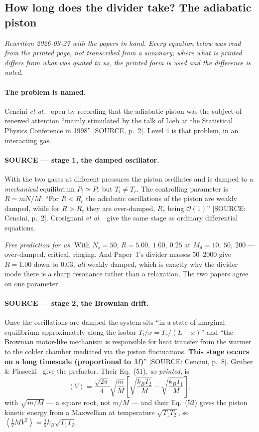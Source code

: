 \documentclass[11pt,a4paper]{article}
\newcommand{\avg}[1]{\left\langle #1 \right\rangle}
\begin{document}
\subsection{How long does the divider take? The adiabatic piston}\label{sec:l4tau}

\emph{Rewritten 2026-09-27 with the papers in hand. Every equation below was read from the printed
page, not transcribed from a summary; where what is printed differs from what was quoted to us, the
printed form is used and the difference is noted.}

\paragraph{The problem is named.} Cencini \emph{et al.}~\cite{cencini2007} open by recording that
the adiabatic piston was the subject of renewed attention ``mainly stimulated by the talk of Lieb at
the Statistical Physics Conference in 1998'' [SOURCE, p.~2]. Level 4 is that problem, in an
interacting gas.

\paragraph{SOURCE --- stage 1, the damped oscillator.} With the two gases at different pressures the
piston oscillates and is damped to a \emph{mechanical} equilibrium $P_l \simeq P_r$ but
$T_l \neq T_r$. The controlling parameter is $R = mN/M$: ``For $R < R_c$ the adiabatic oscillations
of the piston are weakly damped, while for $R > R_c$ they are over-damped, $R_c$ being
$\mathcal{O}(1)$'' [SOURCE: Cencini, p.~2]. Crosignani \emph{et al.}~\cite{crosignani1996} give the
same stage as ordinary differential equations.

\emph{Free prediction for us.} With $N_s = 50$, $R = 5.00,\ 1.00,\ 0.25$ at
$M_d = 10,\ 50,\ 200$ --- over-damped, critical, ringing. And Paper~1's divider masses $50$--$2000$
give $R = 1.00$ down to $0.03$, \emph{all} weakly damped, which is exactly why the divider mode
there is a sharp resonance rather than a relaxation. The two papers agree on one parameter.

\paragraph{SOURCE --- stage 2, the Brownian drift.} Once the oscillations are damped the system sits
``in a state of marginal equilibrium approximately along the isobar $T_l/x = T_r/(L-x)$'' and ``the
Brownian motor-like mechanism is responsible for heat transfer from the warmer to the colder chamber
mediated via the piston fluctuations. \textbf{This stage occurs on a long timescale (proportional to
$M$)}'' [SOURCE: Cencini, p.~8]. Gruber \& Piasecki~\cite{gruber1999} give the prefactor. Their
Eq.~(51), \emph{as printed}, is
\begin{equation}
\avg V = \frac{\sqrt{2\pi}}{4}\sqrt{\frac{m}{M}}
\left[\sqrt{\frac{k_BT_2}{M}} - \sqrt{\frac{k_BT_1}{M}}\right],
\label{eq:gp51}
\end{equation}
with $\sqrt{m/M}$ --- a square root, not $m/M$ --- and their Eq.~(52) gives the piston kinetic
energy from a Maxwellian at temperature $\sqrt{T_1T_2}$, so
$\avg{\tfrac12 MV^2} = \tfrac12 k_B\sqrt{T_1T_2}$.
\end{document}
